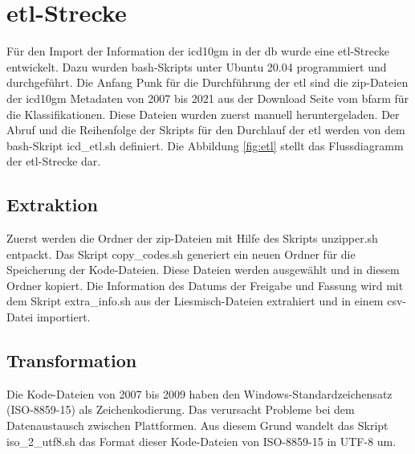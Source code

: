 \section{\acs{etl}-Strecke} \label{etlpipeline}

Für den Import der Information der \ac{icd10gm} in der \ac{db} wurde eine \ac{etl}-Strecke entwickelt. Dazu wurden \ac{bash}-Skripts unter Ubuntu 20.04 programmiert und durchgeführt. Die Anfang Punk für die Durchführung der \ac{etl} sind die \ac{zip}-Dateien der \ac{icd10gm} Metadaten von 2007 bis 2021 aus der Download Seite vom \ac{bfarm} für die Klassifikationen. Diese Dateien wurden zuerst manuell heruntergeladen. Der Abruf und die Reihenfolge der Skripts für den Durchlauf der \ac{etl} werden von dem \ac{bash}-Skript \textsf{icd\_etl.sh} definiert. Die Abbildung \ref{fig:etl} stellt das Flussdiagramm der \ac{etl}-Strecke dar.

\subsection{Extraktion}

Zuerst werden die Ordner der \ac{zip}-Dateien mit Hilfe des Skripts \textsf{unzipper.sh} entpackt. Das Skript \textsf{copy\_codes.sh} generiert ein neuen Ordner für die Speicherung der Kode-Dateien. Diese Dateien werden ausgewählt und in diesem Ordner kopiert. Die Information des Datums der Freigabe und Fassung wird mit dem Skript \textsf{extra\_info.sh} aus der Liesmisch-Dateien extrahiert und in einem \ac{csv}-Datei importiert.

\subsection{Transformation} \label{transf}

Die Kode-Dateien von 2007 bis 2009 haben den Windows-Standardzeichensatz (ISO-8859-15) als Zeichenkodierung. Das verursacht Probleme bei dem Datenaustausch zwischen Plattformen. Aus diesem Grund wandelt das Skript \textsf{iso\_2\_utf8.sh} das Format dieser Kode-Dateien von ISO-8859-15 in UTF-8 um.

